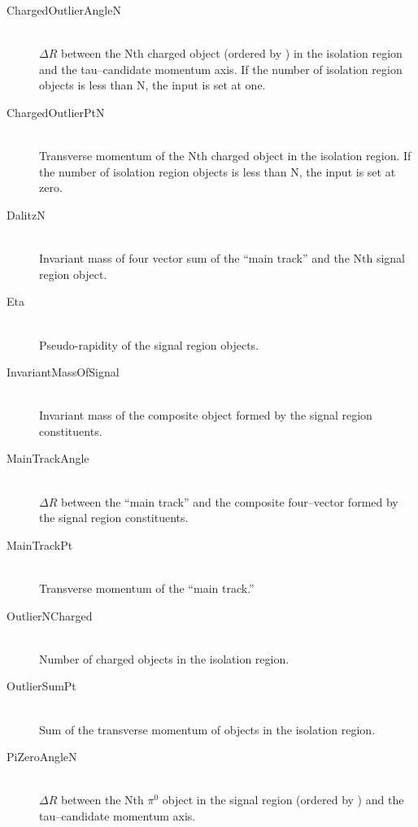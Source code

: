 
\begin{description}
    
  \item[ChargedOutlierAngleN] \hfill \\
  $\Delta R$ between the Nth charged object (ordered by \pt) in the isolation region
    and the tau--candidate momentum axis. If the number of
    isolation region objects is less than N, the input is set at one.

  \item[ChargedOutlierPtN] \hfill \\
  Transverse momentum of the Nth charged object in the isolation region.  If the number of
    isolation region objects is less than N, the input is set at zero.

  \item[DalitzN] \hfill \\
   Invariant mass of four vector sum of the ``main track'' and the Nth signal
    region object. 

  \item[Eta] \hfill \\
  Pseudo-rapidity of the signal region objects. 

  \item[InvariantMassOfSignal] \hfill \\
  Invariant mass of the composite object formed by the signal region constituents.

  \item[MainTrackAngle] \hfill \\
  $\Delta R$ between the ``main track'' and the composite four--vector formed by the 
    signal region constituents.

  \item[MainTrackPt] \hfill \\
  Transverse momentum of the ``main track.'' 

  \item[OutlierNCharged] \hfill \\
  Number of charged objects in the isolation region.

  \item[OutlierSumPt] \hfill \\
  Sum of the transverse momentum of objects in the isolation region.

  \item[PiZeroAngleN] \hfill \\
  $\Delta R$ between the Nth $\pi^0$ object in the signal region (ordered by \pt) and
    the tau--candidate momentum axis.


\end{description}
